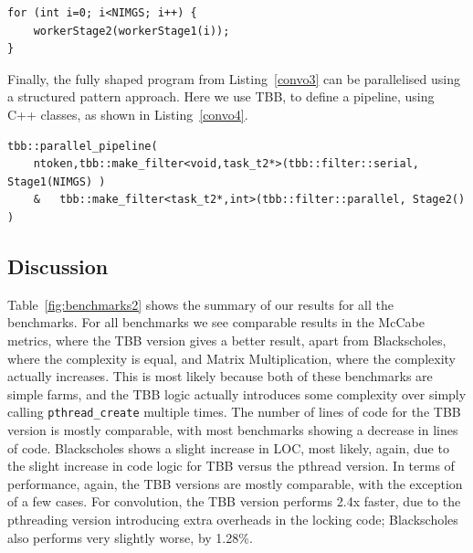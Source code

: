 \begin{lstlisting}[label=convo3,caption={Convolution Shaped}]
for (int i=0; i<NIMGS; i++) {
	workerStage2(workerStage1(i));
}
\end{lstlisting}

\noindent
Finally, the fully shaped program from Listing~\ref{convo3} can be parallelised using a structured pattern approach. Here we use TBB, to define a pipeline, using C++ classes, as shown in Listing~\ref{convo4}.


\begin{lstlisting}[label=convo4, caption={Convolution Restored with TBB}]
tbb::parallel_pipeline(
	ntoken,tbb::make_filter<void,task_t2*>(tbb::filter::serial, Stage1(NIMGS) )
	& 	tbb::make_filter<task_t2*,int>(tbb::filter::parallel, Stage2() )
\end{lstlisting}

\subsection{Discussion}

Table~\ref{fig:benchmarks2} shows the summary of our results for all the benchmarks. For all benchmarks we see comparable results in the McCabe metrics, where the TBB version gives a better result, apart from Blackscholes, where the complexity is equal, and Matrix Multiplication, where the complexity actually increases. This is most likely because both of these benchmarks are simple farms, and the TBB logic actually introduces some complexity over simply calling \lstinline{pthread_create} multiple times. The number of lines of code for the TBB version is mostly comparable, with most benchmarks showing a decrease in lines of code. Blackscholes shows a slight increase in LOC, most likely, again, due to the slight increase in code logic for TBB versus the pthread version. In terms of performance, again, the TBB versions are mostly comparable, with the exception of a few cases. For convolution, the TBB version performs 2.4x faster, due to the pthreading version introducing extra overheads in the locking code; Blackscholes also performs very slightly worse, by 1.28\%.

